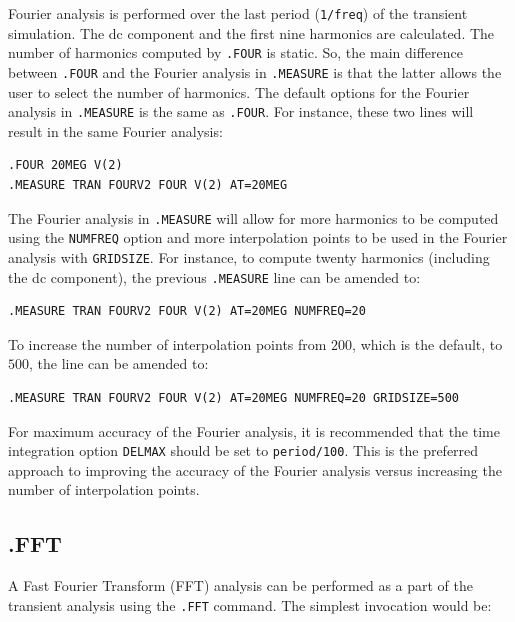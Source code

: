 {{Fourier analysis is performed over the last period (\texttt{1/freq}) of 
the transient simulation.  The dc component and the first nine harmonics are calculated.
The number of harmonics computed by \texttt{.FOUR} is static.  So, the
main difference between \texttt{.FOUR} and the Fourier analysis in \texttt{.MEASURE} is that the latter allows the user to select the number of harmonics.  
The default options for the Fourier analysis in \texttt{.MEASURE} 
is the same as \texttt{.FOUR}.  For instance, these two lines will result in the 
same Fourier analysis:

\begin{verbatim}
.FOUR 20MEG V(2)
.MEASURE TRAN FOURV2 FOUR V(2) AT=20MEG
\end{verbatim}


The Fourier analysis in \texttt{.MEASURE} will allow for more harmonics
to be computed using the \texttt{NUMFREQ} option and more interpolation points
to be used in the Fourier analysis with \texttt{GRIDSIZE}.  
For instance, to compute twenty harmonics
(including the dc component), the previous \texttt{.MEASURE} line can be amended to:

\begin{verbatim}
.MEASURE TRAN FOURV2 FOUR V(2) AT=20MEG NUMFREQ=20
\end{verbatim}

To increase the number of interpolation points from $200$, which is the default,
to $500$, the line can be amended to:

\begin{verbatim}
.MEASURE TRAN FOURV2 FOUR V(2) AT=20MEG NUMFREQ=20 GRIDSIZE=500
\end{verbatim}

For maximum accuracy of the Fourier analysis, it is recommended that 
the time integration option \texttt{DELMAX}
should be set to \texttt{period/100}.  This is the preferred approach to
improving the accuracy of the Fourier analysis versus increasing the number of
interpolation points.

\subsection{.FFT}
A Fast Fourier Transform (FFT) analysis can be performed as a part of the
transient analysis using the \texttt{.FFT} command.  The simplest
invocation would be:

}}

